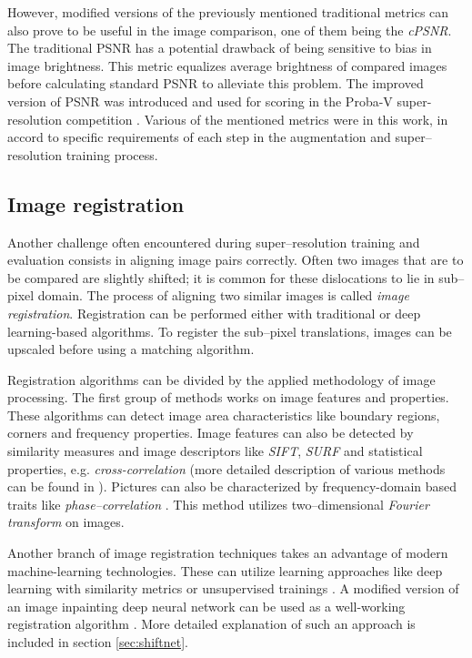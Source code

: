 However, modified versions of the previously mentioned traditional metrics can also prove to be useful in the image comparison, one of them being the \textit{cPSNR}.
The traditional PSNR has a potential drawback of being sensitive to bias in image brightness.
This metric equalizes average brightness of compared images before calculating standard PSNR to alleviate this problem.
The improved version of PSNR was introduced and used for scoring in the Proba-V super-resolution competition \cite{esa-proba-competition}.
Various of the mentioned metrics were in this work, in accord to specific requirements of each step in the augmentation and super--resolution training process.

\subsection{Image registration}
\label{sec:registration}
Another challenge often encountered during super--resolution training and evaluation consists in aligning image pairs correctly.
Often two images that are to be compared are slightly shifted; it is common for these dislocations to lie in sub--pixel domain.
The process of aligning two similar images is called \textit{image registration}.
Registration can be performed either with traditional or deep learning-based algorithms.
To register the sub--pixel translations, images can be upscaled before using a matching algorithm.

Registration algorithms can be divided by the applied methodology of image processing.
The first group of methods works on image features and properties.
These algorithms can detect image area characteristics like boundary regions, corners and frequency properties.
Image features can also be detected by similarity measures and image descriptors like \textit{SIFT}, \textit{SURF} and statistical properties, e.g. \textit{cross-correlation} (more detailed description of various methods can be found in \cite{jain-2015-registration}).
Pictures can also be characterized by frequency-domain based traits like \textit{phase--correlation} \cite{guizar-2008-registration}.
This method utilizes two--dimensional \textit{Fourier transform} on images.

Another branch of image registration techniques takes an advantage of modern machine-learning technologies.
These can utilize learning approaches like deep learning with similarity metrics or unsupervised trainings \cite{haskins-2020-deepregistration}.
A modified version of an image inpainting deep neural network can be used as a well-working registration algorithm \cite{deudon-2020-highresnet, zhaoyi-2018-shiftnet}.
More detailed explanation of such an approach is included in section \ref{sec:shiftnet}.

